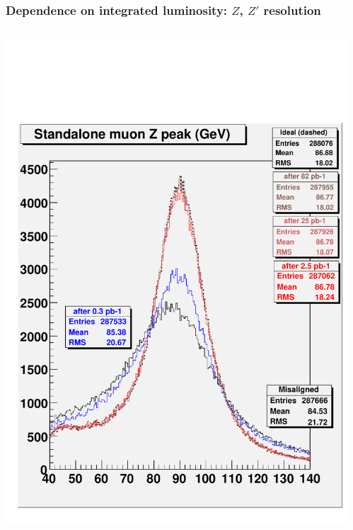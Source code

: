 \documentclass[compress]{beamer}
\begin{document}
\begin{frame}
\frametitle{Dependence on integrated luminosity: $Z$, $Z'$ resolution}
\vspace{0.25 cm}
\begin{columns}
\begin{center}
\includegraphics[width=0.9\linewidth]{checkit_standaloneZ.pdf}
\end{center}
\begin{center}

\end{center}
\end{columns}
\end{frame}
\end{document}
